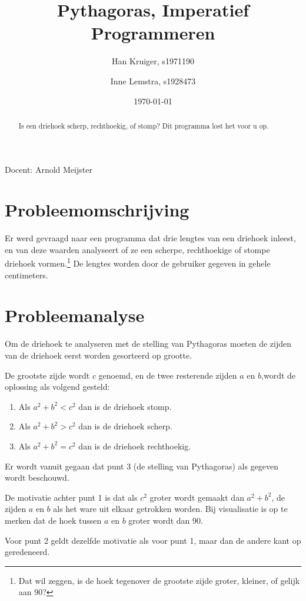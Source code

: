 \documentclass[a4paper,10pt]{article}
\title{Pythagoras, Imperatief Programmeren}
\author{Han Kruiger, s1971190 \and Inne Lemstra, s1928473}
\date{\today}
\begin{document}
\maketitle
Docent: Arnold Meijster

\begin{abstract}
Is een driehoek scherp, rechthoekig, of stomp? Dit programma lost het voor u op.
\end{abstract}

\section{Probleemomschrijving}
Er werd gevraagd naar een programma dat drie lengtes van een driehoek inleest, en van deze waarden analyseert of ze een scherpe, rechthoekige of stompe driehoek vormen.\footnote{Dat wil zeggen, is de hoek tegenover de grootste zijde groter, kleiner, of gelijk aan 90\textdegree?} De lengtes worden door de gebruiker gegeven in gehele centimeters.

\section{Probleemanalyse}

Om de driehoek te analyseren met de stelling van Pythagoras moeten de zijden van de driehoek eerst worden gesorteerd op grootte.

De grootste zijde wordt $c$ genoemd, en de twee resterende zijden $a$ en $b$,wordt de oplossing als volgend gesteld:

\begin{enumerate}
 \item Als $a^2 + b^2 < c^2$ dan is de driehoek stomp.
 \item Als $a^2 + b^2 > c^2$ dan is de driehoek scherp.
 \item Als $a^2 + b^2 = c^2$ dan is de driehoek rechthoekig.
\end{enumerate}

Er wordt vanuit gegaan dat punt 3 (de stelling van Pythagoras) als gegeven wordt beschouwd.

De motivatie achter punt 1 is dat als $c^2$ groter wordt gemaakt dan $a^2 + b^2$, de zijden $a$ en $b$ als het ware uit elkaar getrokken worden. Bij visualisatie is op te merken dat de hoek tussen $a$ en $b$ groter wordt dan 90\textdegree.

Voor punt 2 geldt dezelfde motivatie als voor punt 1, maar dan de andere kant op geredeneerd.
\end{document}
